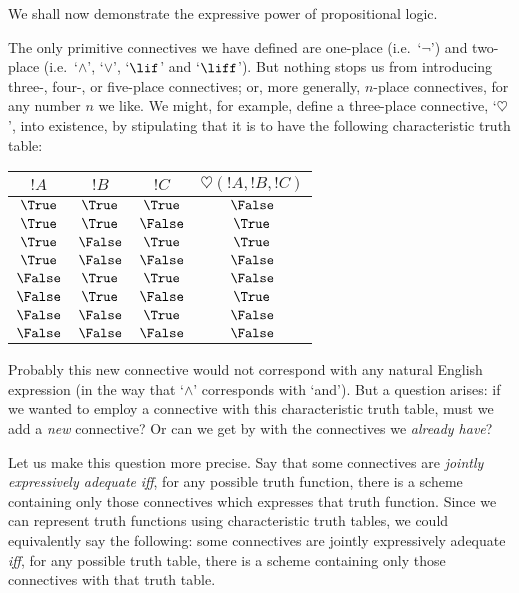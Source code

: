 \documentclass[../../../include/open-logic-section]{subfiles}
\begin{document}


We shall now demonstrate the expressive power of propositional logic.

The only primitive connectives we have defined are one-place (i.e.\ `$\lnot$') and two-place (i.e.\ `$\land$', `$\lor$', `$\lif$' and `$\liff$'). But nothing stops us from introducing three-, four-, or five-place connectives; or, more generally, $n$-place connectives, for any number $n$ we like. We might, for example, define a three-place connective, `$\heartsuit$', into existence, by stipulating that it is to have the following characteristic truth table:
\begin{center}
\begin{tabular}{c c c | c}
${!A}$ & ${!B}$ & ${!C}$ & $\heartsuit({!A},{!B},{!C})$\\
\hline
 $\True$  & $\True$  & $\True$  & $\False$ \\
 $\True$  & $\True$  & $\False$ & $\True$  \\
 $\True$  & $\False$ & $\True$  & $\True$  \\
 $\True$  & $\False$ & $\False$ & $\False$ \\
 $\False$ & $\True$  & $\True$  & $\False$ \\
 $\False$ & $\True$  & $\False$ & $\True$  \\
 $\False$ & $\False$ & $\True$  & $\False$ \\
 $\False$ & $\False$ & $\False$ & $\False$
\end{tabular}
\end{center}
Probably this new connective would not correspond with any natural English expression (in the way that `$\land$' corresponds with `and'). But a question arises: if we wanted to employ a connective with this characteristic truth table, must we add a \emph{new} connective? Or can we get by with the connectives we \emph{already have}?

Let us make this question more precise. Say that some connectives are \emph{jointly expressively adequate} \emph{iff}, for any possible truth function, there is a scheme containing only those connectives which expresses that truth function. Since we can represent truth functions using characteristic truth tables, we could equivalently say the following: some connectives are jointly expressively adequate \emph{iff}, for any possible truth table, there is a scheme containing only those connectives with that truth table.
\end{document}
